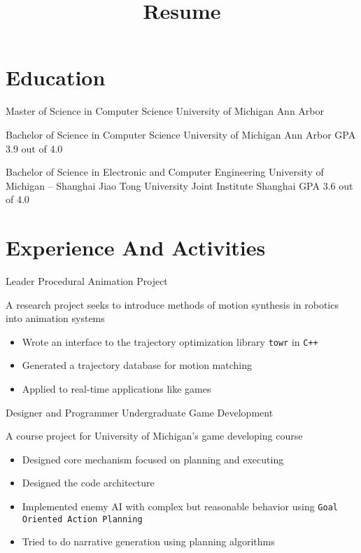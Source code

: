 \documentclass[10pt, a4paper, sans]{moderncv}
\title{Resume}
\begin{document}
\makecvtitle

\section{Education}
{Master of Science in Computer Science}
{University of Michigan}
{Ann Arbor}
{}
{}

{Bachelor of Science in Computer Science}
{University of Michigan}
{Ann Arbor}
{GPA 3.9 out of 4.0}
{}

{Bachelor of Science in Electronic and Computer Engineering}
{University of Michigan -- Shanghai Jiao Tong University Joint Institute}
{Shanghai}
{GPA 3.6 out of 4.0}
{}

\section{Experience And Activities}
{Leader}
{Procedural Animation Project}
{}{}
{A research project seeks to introduce methods of motion synthesis in robotics into animation systems
	\begin{itemize}
		\item Wrote an interface to the trajectory optimization library \texttt{towr} in \texttt{C++}
		\item Generated a trajectory database for motion matching
		\item Applied to real-time applications like games
	\end{itemize}
}

{Designer and Programmer}
{Undergraduate Game Development}
{}{}
{A course project for University of Michigan's game developing course
	\begin{itemize}
		\item Designed core mechanism focused on planning and executing
		\item Designed the code architecture
		\item Implemented enemy AI with complex but reasonable behavior using \texttt{Goal Oriented Action Planning}
		\item Tried to do narrative generation using planning algorithms
	\end{itemize}
}
\end{document}
